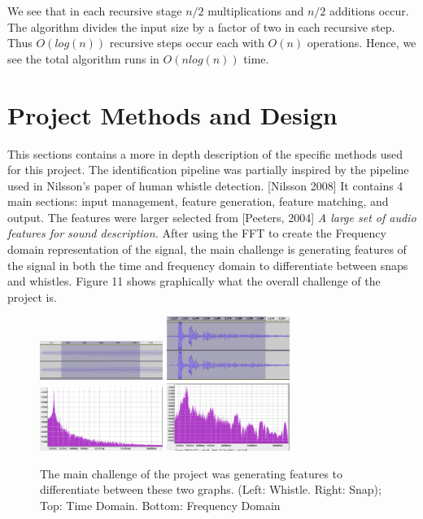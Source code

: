 \documentclass[DIV=calc, paper=a4, fontsize=11pt, twocolumn]{scrartcl}   %
\begin{document}
We see that in each recursive stage $n/2$ multiplications and $n/2$ additions occur. The algorithm divides the input size by a factor of two in each recursive step. Thus $O(log(n))$ recursive steps occur each with $O(n)$ operations. Hence, we see the total algorithm runs in $O(nlog(n))$ time.

\section{Project Methods and Design}
   This sections contains a more in depth description of the specific methods used for this project.
   The identification pipeline was partially inspired by the pipeline used in Nilsson's paper of human whistle detection. [Nilsson 2008] It contains 4 main sections: input management, feature generation, feature matching, and output. The features were larger selected from [Peeters, 2004] \textit{A large set of audio features for sound description.} After using the FFT to create the Frequency domain representation of the signal, the main challenge is generating features of the signal in both the time and frequency domain to differentiate between snaps and whistles. Figure 11 shows graphically what the overall challenge of the project is.

   \begin{figure}[h]
   \centering
   \includegraphics[width=40mm]{figures/whistle_frame_t.png}
   \includegraphics[width=40mm]{figures/snapTimeDomainFrame.png}
   \includegraphics[width=40mm]{figures/whistle_frame_f.png}
   \includegraphics[width=40mm]{figures/SnapFreqDomainFrame.png}
   \caption{The main challenge of the project was generating features to differentiate between these two graphs. (Left: Whistle. Right: Snap); Top: Time Domain. Bottom: Frequency Domain}
   \label{overflow}
   \end{figure}
\end{document}
